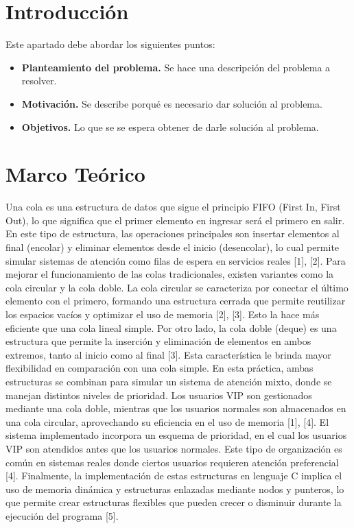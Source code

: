 \documentclass[letterpaper,12pt,oneside]{article}
\begin{document}
\tableofcontents
\clearpage

\section{Introducción}

Este apartado debe abordar los siguientes puntos:

\begin{itemize}
\item \textbf{Planteamiento del problema.} Se hace una descripción del problema a resolver.
\item \textbf{Motivación.} Se describe porqué es necesario dar solución al problema.
\item \textbf{Objetivos.} Lo que se se espera obtener de darle solución al problema.
\end{itemize}

\section{Marco Teórico}

Una cola es una estructura de datos que sigue el principio FIFO (First In, First Out), lo que significa que el primer elemento en ingresar será el primero en salir. En este tipo de estructura, las operaciones principales son insertar elementos al final (encolar) y eliminar elementos desde el inicio (desencolar), lo cual permite simular sistemas de atención como filas de espera en servicios reales [1], [2].
Para mejorar el funcionamiento de las colas tradicionales, existen variantes como la cola circular y la cola doble. La cola circular se caracteriza por conectar el último elemento con el primero, formando una estructura cerrada que permite reutilizar los espacios vacíos y optimizar el uso de memoria [2], [3]. Esto la hace más eficiente que una cola lineal simple.
Por otro lado, la cola doble (deque) es una estructura que permite la inserción y eliminación de elementos en ambos extremos, tanto al inicio como al final [3]. Esta característica le brinda mayor flexibilidad en comparación con una cola simple.
En esta práctica, ambas estructuras se combinan para simular un sistema de atención mixto, donde se manejan distintos niveles de prioridad. Los usuarios VIP son gestionados mediante una cola doble, mientras que los usuarios normales son almacenados en una cola circular, aprovechando su eficiencia en el uso de memoria [1], [4].
El sistema implementado incorpora un esquema de prioridad, en el cual los usuarios VIP son atendidos antes que los usuarios normales. Este tipo de organización es común en sistemas reales donde ciertos usuarios requieren atención preferencial [4].
Finalmente, la implementación de estas estructuras en lenguaje C implica el uso de memoria dinámica y estructuras enlazadas mediante nodos y punteros, lo que permite crear estructuras flexibles que pueden crecer o disminuir durante la ejecución del programa [5].
\end{document}
